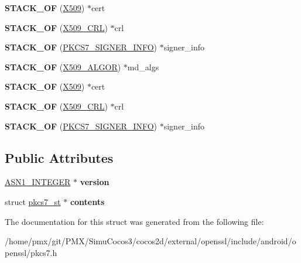 \begin{DoxyCompactItemize}
\mbox{\label{structpkcs7__signed__st_a65d24e39f334b42fa460d9d7a87398ef}} 
{\bfseries S\+T\+A\+C\+K\+\_\+\+OF} (\hyperlink{structx509__st}{X509}) $\ast$cert
\item 
\mbox{\label{structpkcs7__signed__st_ac57f323e546efcca576407ecebd2177a}} 
{\bfseries S\+T\+A\+C\+K\+\_\+\+OF} (\hyperlink{structX509__crl__st}{X509\+\_\+\+C\+RL}) $\ast$crl
\item 
\mbox{\label{structpkcs7__signed__st_a4580e59fda0e62101ecc513a43512cee}} 
{\bfseries S\+T\+A\+C\+K\+\_\+\+OF} (\hyperlink{structpkcs7__signer__info__st}{P\+K\+C\+S7\+\_\+\+S\+I\+G\+N\+E\+R\+\_\+\+I\+N\+FO}) $\ast$signer\+\_\+info
\item 
\mbox{\label{structpkcs7__signed__st_a050bcf61058179b5d869b55e7e357816}} 
{\bfseries S\+T\+A\+C\+K\+\_\+\+OF} (\hyperlink{structX509__algor__st}{X509\+\_\+\+A\+L\+G\+OR}) $\ast$md\+\_\+algs
\item 
\mbox{\label{structpkcs7__signed__st_a65d24e39f334b42fa460d9d7a87398ef}} 
{\bfseries S\+T\+A\+C\+K\+\_\+\+OF} (\hyperlink{structx509__st}{X509}) $\ast$cert
\item 
\mbox{\label{structpkcs7__signed__st_ac57f323e546efcca576407ecebd2177a}} 
{\bfseries S\+T\+A\+C\+K\+\_\+\+OF} (\hyperlink{structX509__crl__st}{X509\+\_\+\+C\+RL}) $\ast$crl
\item 
\mbox{\label{structpkcs7__signed__st_a4580e59fda0e62101ecc513a43512cee}} 
{\bfseries S\+T\+A\+C\+K\+\_\+\+OF} (\hyperlink{structpkcs7__signer__info__st}{P\+K\+C\+S7\+\_\+\+S\+I\+G\+N\+E\+R\+\_\+\+I\+N\+FO}) $\ast$signer\+\_\+info
\end{DoxyCompactItemize}
\subsection*{Public Attributes}
\begin{DoxyCompactItemize}
\item 
\mbox{\label{structpkcs7__signed__st_a154ed5053f2250ffdfc3cef851c31288}} 
\hyperlink{structasn1__string__st}{A\+S\+N1\+\_\+\+I\+N\+T\+E\+G\+ER} $\ast$ {\bfseries version}
\item 
\mbox{\label{structpkcs7__signed__st_ac3db39eeab9c903e600c38114eaf5c74}} 
struct \hyperlink{structpkcs7__st}{pkcs7\+\_\+st} $\ast$ {\bfseries contents}
\end{DoxyCompactItemize}


The documentation for this struct was generated from the following file\+:\begin{DoxyCompactItemize}
\item 
/home/pmx/git/\+P\+M\+X/\+Simu\+Cocos3/cocos2d/external/openssl/include/android/openssl/pkcs7.\+h\end{DoxyCompactItemize}
